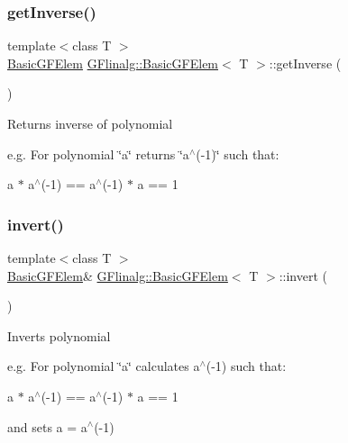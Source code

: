 \subsubsection{\texorpdfstring{getInverse()}{getInverse()}}
{\footnotesize\ttfamily template$<$class T $>$ \\
\mbox{\hyperlink{class_g_flinalg_1_1_basic_g_f_elem}{Basic\+G\+F\+Elem}} \mbox{\hyperlink{class_g_flinalg_1_1_basic_g_f_elem}{G\+Flinalg\+::\+Basic\+G\+F\+Elem}}$<$ T $>$\+::get\+Inverse (\begin{DoxyParamCaption}{ }\end{DoxyParamCaption})\hspace{0.3cm}{\ttfamily [inline]}}

Returns inverse of polynomial

e.\+g. For polynomial \char`\"{}a\char`\"{} returns \char`\"{}a$^\wedge$(-\/1)\char`\"{} such that\+:

a $\ast$ a$^\wedge$(-\/1) == a$^\wedge$(-\/1) $\ast$ a == 1 \mbox{\label{class_g_flinalg_1_1_basic_g_f_elem_a9e3eeb4bfa609121887f67b229988a46}} 
\subsubsection{\texorpdfstring{invert()}{invert()}}
{\footnotesize\ttfamily template$<$class T $>$ \\
\mbox{\hyperlink{class_g_flinalg_1_1_basic_g_f_elem}{Basic\+G\+F\+Elem}}\& \mbox{\hyperlink{class_g_flinalg_1_1_basic_g_f_elem}{G\+Flinalg\+::\+Basic\+G\+F\+Elem}}$<$ T $>$\+::invert (\begin{DoxyParamCaption}{ }\end{DoxyParamCaption})\hspace{0.3cm}{\ttfamily [inline]}}

Inverts polynomial

e.\+g. For polynomial \char`\"{}a\char`\"{} calculates a$^\wedge$(-\/1) such that\+:

a $\ast$ a$^\wedge$(-\/1) == a$^\wedge$(-\/1) $\ast$ a == 1

and sets a = a$^\wedge$(-\/1) \mbox{\label{class_g_flinalg_1_1_basic_g_f_elem_aac981dfbea7fe6c43117f26e2dcaf50c}} 
